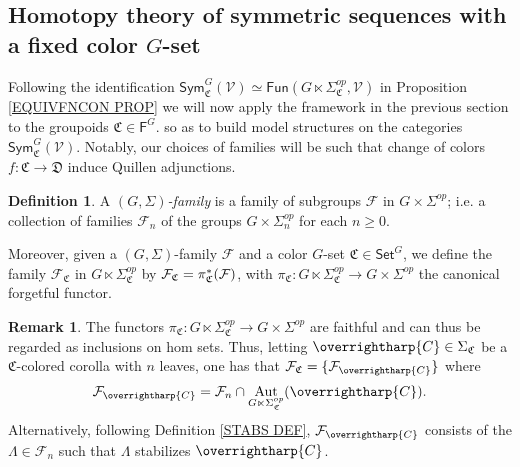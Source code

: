 \documentclass[a4paper,10pt
,draft
]{article}%
\numberwithin{equation}{section}
\numberwithin{figure}{section}
\theoremstyle{definition} %
\newtheorem{definition}[equation]{Definition}%
\newtheorem{remark}[equation]{Remark}%
\newcommand{\vect}[1]{\text{\overrightharp{\ensuremath{#1}}}}
\DeclareMathOperator{\Aut}{Aut}%
\newcommand{\F}{\ensuremath{\mathcal F}}
\newcommand{\V}{\ensuremath{\mathcal V}}
\newcommand{\1}{\ensuremath{\mathbbm 1}}%
\begin{document}
\subsection{Homotopy theory of symmetric sequences with a fixed color $G$-set}
\label{SYMC_MS_SEC}


Following the identification 
$\mathsf{Sym}^G_{\mathfrak{C}}(\V)
\simeq
\mathsf{Fun}(G \ltimes \Sigma^{op}_{\mathfrak{C}},\V)$
in Proposition \ref{EQUIVFNCON PROP}
we will now apply the framework in the previous section 
to the groupoids
$\mathfrak{C} \in \mathsf{F}^G$.
so as to build model structures on the categories 
$\mathsf{Sym}^G_{\mathfrak{C}}(\V)$.
%
Notably, our choices of families will be such that 
change of colors $f\colon \mathfrak{C} \to \mathfrak{D}$ 
induce Quillen adjunctions.



\begin{definition}\label{GSFAM_DEF}
A \emph{$(G,\Sigma)$-family} is a family of subgroups $\mathcal{F}$ in $G \times \Sigma^{op}$;
i.e.
a collection of families $\F_n$ of the groups $G\times \Sigma_n^{op}$ for each $n \geq 0$.
      
Moreover, given a $(G,\Sigma)$-family $\F$ and a color $G$-set $\mathfrak C \in \mathsf{Set}^G$,
we define the family
$\mathcal{F}_{\mathfrak{C}}$ in
$G \ltimes \Sigma^{op}_{\mathfrak{C}}$
by $\mathcal{F}_{\mathfrak{C}} = \pi^{\**}_{\mathfrak{C}}(\mathcal{F})$,
with $\pi_{\mathfrak{C}} \colon G \ltimes \Sigma_{\mathfrak{C}}^{op} \to G \times \Sigma^{op}$
the canonical forgetful functor.
\end{definition}






\begin{remark}\label{FAMC_DEF_REM}
The functors
$\pi_{\mathfrak{C}} \colon
G \ltimes \Sigma_{\mathfrak{C}}^{op} \to
G \times \Sigma^{op}$
are faithful and can thus be regarded as inclusions on hom sets.
Thus, letting $\vect{C} \in \Sigma_{\mathfrak{C}}$ be a
$\mathfrak{C}$-colored corolla with $n$ leaves,
one has that
$\F_{\mathfrak{C}} = \{\F_{\vect{C}}\}$ where
\begin{equation}\label{FAMC_DEF_EQ}
	\F_{\vect{C}} = \F_n \cap \Aut_{G \ltimes \Sigma_{\mathfrak C}^{op}}(\vect C).
\end{equation}
Alternatively, following
Definition \ref{STABS DEF},
$\F_{\vect{C}}$ consists of the $\Lambda \in \F_n$
such that $\Lambda$ stabilizes $\vect{C}$.
\end{remark}
\end{document}

